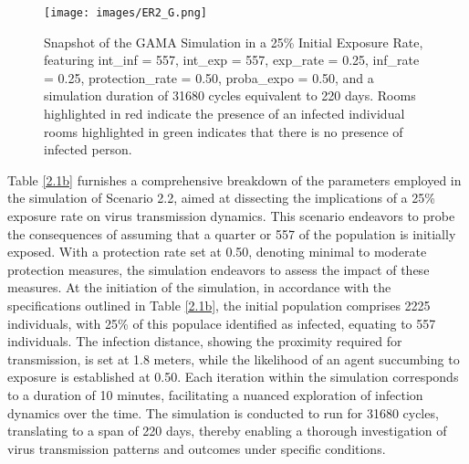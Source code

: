 	\begin{figure}[H]
		\centering
		\texttt{[image: images/ER2\_G.png]}
		\caption{Snapshot of the GAMA Simulation in a 25\% Initial Exposure Rate, featuring int\_inf = 557, int\_exp = 557, exp\_rate = 0.25, inf\_rate = 0.25, protection\_rate = 0.50, proba\_expo = 0.50, and a simulation duration of 31680 cycles equivalent to 220 days. Rooms highlighted in red indicate the presence of an infected individual rooms highlighted in green indicates that there is no presence of infected person.}
		\label{ER2G}
	\end{figure}

Table \ref{2.1b} furnishes a comprehensive breakdown of the parameters employed in the simulation of Scenario 2.2, aimed at dissecting the implications of a 25\% exposure rate on virus transmission dynamics. This scenario endeavors to probe the consequences of assuming that a quarter or 557 of the population is initially exposed. With a protection rate set at 0.50, denoting minimal to moderate protection measures, the simulation endeavors to assess the impact of these measures. At the initiation of the simulation, in accordance with the specifications outlined in Table \ref{2.1b}, the initial population comprises 2225 individuals, with 25\% of this populace identified as infected, equating to 557 individuals. The infection distance, showing the proximity required for transmission, is set at 1.8 meters, while the likelihood of an agent succumbing to exposure is established at 0.50. Each iteration within the simulation corresponds to a duration of 10 minutes, facilitating a nuanced exploration of infection dynamics over the time. The simulation is conducted to run for 31680 cycles, translating to a span of 220 days, thereby enabling a thorough investigation of virus transmission patterns and outcomes under specific conditions.

